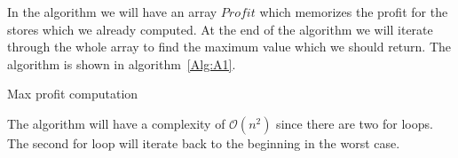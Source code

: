 \documentclass{article}
\newcommand{\bigO}{\mathcal{O}}
\begin{document}
In the algorithm we will have an array $Profit$ which memorizes the profit for the stores which we already computed. At the end of the algorithm we will iterate through the whole array to find the maximum value which we should return. The algorithm is shown in algorithm~\ref{Alg:A1}.
\begin{algorithm}[h]
  \DontPrintSemicolon

    \caption{Max profit computation} \label{Alg:A1}
\end{algorithm}

The algorithm will have a complexity of $\bigO (n^2)$ since there are two for loops. The second for loop will iterate back to the beginning in the worst case.

\newpage
\end{document}
